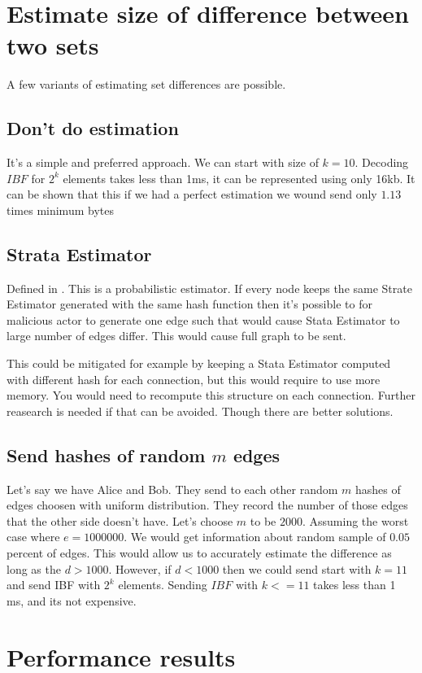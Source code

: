 \documentclass[11pt]{article}
\begin{document}
\section{Estimate size of difference between two sets}\label{sec:estimate}
A few variants of estimating set differences are possible.
\subsection{Don't do estimation}
It's a simple and preferred approach. 
We can start with size of $k = 10$. Decoding $IBF$ for $2^k$ elements takes less than 1ms, it can be represented using only 16kb. 
It can be shown that this if we had a perfect estimation we wound send only $1.13$ times minimum bytes

\subsection{Strata Estimator}
Defined in \cite{esrwpc}. 
This is a probabilistic estimator. If every node keeps the same Strate Estimator generated with the same hash function then it's possible to for malicious actor to generate one edge such that would cause Stata Estimator to large number of edges differ. This would cause full graph to be sent.
 
This could be mitigated for example by keeping a Stata Estimator computed with different hash for each connection, but this would require to use more memory. 
You would need to recompute this structure on each connection. 
Further reasearch is needed if that can be avoided. Though there are better solutions.
\subsection{Send hashes of random $m$ edges}
Let's say we have Alice and Bob. 
They send to each other random $m$ hashes  of edges choosen with uniform distribution. 
They record the number of those edges that the other side doesn't have.
Let's choose $m$ to be $2000$.
Assuming the worst case where $e = 1000000$. We would get information about random sample of $0.05$ percent of edges.
This would allow us to accurately estimate the difference as long as the $d > 1000$.
However, if $d < 1000$ then we could send start with $k = 11$ and send IBF with $2^k$ elements. 
Sending $IBF$ with $k <= 11$ takes less than 1 ms, and its not expensive.

\section{Performance results}
\end{document}
